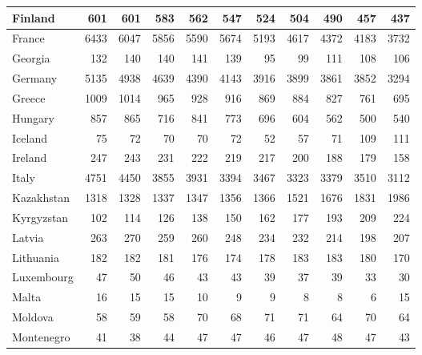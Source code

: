 \begin{table}
\begin{tabular}{|l|r|r|r|r|r|r|r|r|r|r|}
                       Finland&    601&    601&    583&    562&    547&    524&    504&    490&    457&    437\\\hline
                        France&   6433&   6047&   5856&   5590&   5674&   5193&   4617&   4372&   4183&   3732\\\hline
                       Georgia&    132&    140&    140&    141&    139&     95&     99&    111&    108&    106\\\hline
                       Germany&   5135&   4938&   4639&   4390&   4143&   3916&   3899&   3861&   3852&   3294\\\hline
                        Greece&   1009&   1014&    965&    928&    916&    869&    884&    827&    761&    695\\\hline
                       Hungary&    857&    865&    716&    841&    773&    696&    604&    562&    500&    540\\\hline
                       Iceland&     75&     72&     70&     70&     72&     52&     57&     71&    109&    111\\\hline
                       Ireland&    247&    243&    231&    222&    219&    217&    200&    188&    179&    158\\\hline
                         Italy&   4751&   4450&   3855&   3931&   3394&   3467&   3323&   3379&   3510&   3112\\\hline
                    Kazakhstan&   1318&   1328&   1337&   1347&   1356&   1366&   1521&   1676&   1831&   1986\\\hline
                    Kyrgyzstan&    102&    114&    126&    138&    150&    162&    177&    193&    209&    224\\\hline
                        Latvia&    263&    270&    259&    260&    248&    234&    232&    214&    198&    207\\\hline
                     Lithuania&    182&    182&    181&    176&    174&    178&    183&    183&    180&    170\\\hline
                    Luxembourg&     47&     50&     46&     43&     43&     39&     37&     39&     33&     30\\\hline
                         Malta&     16&     15&     15&     10&      9&      9&      8&      8&      6&     15\\\hline
                       Moldova&     58&     59&     58&     70&     68&     71&     71&     64&     70&     64\\\hline
                    Montenegro&     41&     38&     44&     47&     47&     46&     47&     48&     47&     43\\\hline

\end{tabular}
\end{table}
